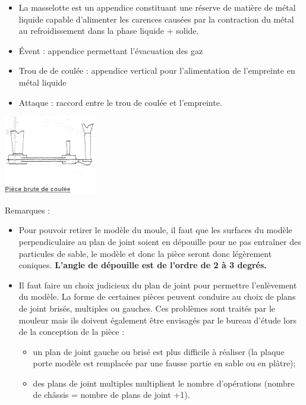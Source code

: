 \documentclass[11pt,oneside]{article}
\begin{document}
\begin{multicols}{2}
\begin{itemize}
 \item La masselotte est un appendice constituant une réserve de matière de
métal liquide capable d'alimenter les carences causées par la contraction du
métal au refroidissement dans la phase liquide + solide.
\item Évent : appendice permettant l'évacuation des gaz
\item Trou de de coulée : appendice vertical pour l'alimentation de l'empreinte
en métal liquide
\item Attaque : raccord entre le trou de coulée et l'empreinte.
\end{itemize}

\begin{center}
 \includegraphics[width=.3\textwidth]{png/moulage6}
\end{center}
\end{multicols}

Remarques : 
\begin{itemize}
\item Pour pouvoir retirer le modèle du moule, il faut que les surfaces du
modèle perpendiculaire au plan de joint soient en dépouille pour ne pas
entraîner des particules de sable, le modèle et donc la pièce seront donc
légèrement coniques.
\textbf{L'angle de dépouille est de l'ordre de 2 à 3 degrés.}
\item Il faut faire un choix judicieux du plan de joint pour permettre
l'enlèvement du modèle. La forme de certaines pièces peuvent conduire au choix
de plans de joint brisés, multiples ou gauches. Ces problèmes sont traités par
le mouleur mais ils doivent également être envisagés par le bureau d'étude lors
de la conception de la pièce :
\begin{itemize}
\item un plan de joint gauche ou brisé est plus difficile à réaliser (la plaque
porte modèle est remplacée par une fausse partie en sable ou en plâtre);
\item des plans de joint multiples multiplient le nombre d'opérations (nombre
de châssis = nombre de plans de joint +1).
\end{itemize}
\end{itemize}
\end{document}
